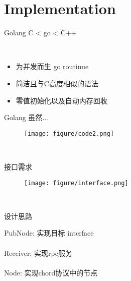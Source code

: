 \documentclass[10pt]{beamer}
\begin{document}
\section{Implementation}
\begin{frame}{Golang}
C < go < C++

\\[20pt]

\begin{itemize}
\item 为并发而生 go routinue
\item 简洁且与C高度相似的语法
\item 零值初始化以及自动内存回收

\end{itemize}
\end{frame}

\begin{frame}{Golang}
虽然...

\begin{figure}
\centering
\texttt{[image: figure/code2.png]}
\end{figure}

\\[20pt]

\end{frame}

\begin{frame}{接口需求}

\begin{figure}
\texttt{[image: figure/interface.png]}
\end{figure}

\\[20pt]

\end{frame}

\begin{frame}{设计思路}

\alert{PubNode:} 实现目标 interface \\

\\[20pt]

\alert{Receiver:} 实现rpc服务 \\

\\[20pt]

\alert{Node:} 实现chord协议中的节点 \\

\\[20pt]

\end{frame}
\end{document}
